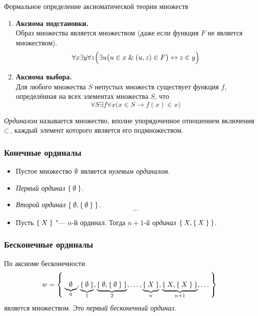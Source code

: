 \begin{undefthm}{Формальное определение аксиоматической теории множеств}
\begin{enumerate}
		\item \textbf{Аксиома подстановки.} \\
			Образ множества является множеством (даже если функция $ F $ не является множеством).
			$$ \forall x \exists y \forall z \Bigl( \exists u \bigl( u \in x \mathrel\& (u, z) \in F \bigr) \leftrightarrow z \in y \Bigr) $$

		\item \textbf{Аксиома выбора.} \\
			Для любого множества $ S $ непустых множеств существует функция $ f $, определённая на всех элементах множества $ S $, что
			$$ \forall S \exists f \forall x \bigl( x \in S \to f(x) \in x \bigr) $$
	\end{enumerate}
\end{undefthm}

\begin{definition}
	\emph{Ординалом} называется множество, вполне упорядоченное отношением включения $ \subset $, каждый элемент которого является его подмножеством.
\end{definition}

\subsubsection*{Конечные ординалы}

\begin{itemize}
	\item Пустое множество $ \emptyset $ является \emph{нулевым ординалом}.
	\item \emph{Первый ординал} $ \Set{\ensuremath{\emptyset}} $.
	\item \emph{Второй ординал} $ \Set{\ensuremath{\emptyset}, \Set{\ensuremath{\emptyset}}} $.
		$$ \dots $$
	\item Пусть $ \Set{X} $ "--- $ n $-й ординал. Тогда $ n + 1 $-\emph{й ординал} $ \Set{X, \Set{X}} $.
\end{itemize}

\subsubsection*{Бесконечные ординалы}

По аксиоме бесконечности
$$ w = \Set{ \underbrace{\ensuremath{\emptyset}}_0, \underbrace{\Set{\ensuremath{\emptyset}}}_1, \underbrace{\Set{\ensuremath{\emptyset}, \Set{\ensuremath{\emptyset}}}}_2, \dots, \underbrace{\Set{X}}_n, \underbrace{\Set{X, \Set{X}}}_{n + 1}, \dots} $$
является множеством. Это \emph{первый бесконечный ординал}.

